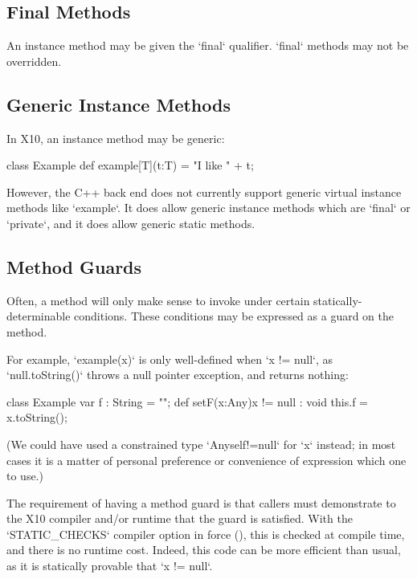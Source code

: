 \subsection{Final Methods}
An instance method may be given the \xcd`final` qualifier.  \xcd`final`
methods may not be overridden.

\subsection{Generic Instance Methods}

\limitationx{}
In X10, an instance method may be generic: 
\begin{xten}
class Example {
  def example[T](t:T) = "I like " + t;
}
\end{xten}
%

However, the C++ back end does not currently support generic virtual instance
methods like \xcd`example`.  It does allow generic instance methods which are
\xcd`final` or \xcd`private`, and it does allow generic static methods.  


\subsection{Method Guards}
\label{MethodGuard}

Often, a method will only make sense to invoke under certain
statically-determinable conditions.  These conditions may be expressed as a
guard on the method.

\begin{ex}
For example, \xcd`example(x)` is only
well-defined when \xcd`x != null`, as \xcd`null.toString()` throws a null
pointer exception, and returns nothing: 
% 
\begin{xten}
class Example {
   var f : String = "";
   def setF(x:Any){x != null} : void {
      this.f = x.toString();
   }
}
\end{xten}
%
\noindent
(We could have used a constrained type \xcd`Any{self!=null}` for \xcd`x`
instead; in
most cases it is a matter of personal preference or convenience of expression
which one to use.) 
\end{ex}


The requirement of having a method guard 
is that callers must demonstrate to
the X10
compiler and/or runtime that the guard is satisfied.  
With the \xcd`STATIC_CHECKS` compiler option in force (), this is
checked at compile time, and there is no runtime cost.
Indeed, this code can be more efficient than usual, as it is statically provable that \xcd`x != null`.

